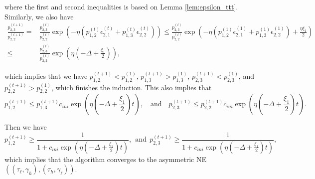 where the first and second inequalities is based on Lemma \ref{lem:epsilon_ttt}. Similarly, we also have 
\begin{equation*}
    \begin{split}
  \frac{p^{(t+1)}_{2,3}}{p^{(t+1)}_{2,2}} = {} & \frac{p^{(t)}_{2,3}}{p^{(t)}_{2,2}}\exp\left(-\eta\left(p^{(t)}_{1,2}\epsilon^{(t)}_{2,1} + p^{(t)}_{1,3}\epsilon^{(t)}_{2,2}\right)\right) \leq \frac{p^{(t)}_{2,3}}{p^{(t)}_{2,2}}\exp\left(-\eta\left(p^{(1)}_{1,2}\epsilon^{(1)}_{2,1} + p^{(1)}_{1,3}\epsilon^{(1)}_{2,2}\right)+\frac{\eta\xi_1}{2}\right)\\
  \leq {} & \frac{p^{(t)}_{2,3}}{p^{(t)}_{2,2}}\exp\left(\eta\left(-\Delta+\frac{\xi_1}{2}\right)\right),       
    \end{split}
\end{equation*}

which implies that we have $p^{(t+1)}_{1,2}< p^{(1)}_{1,2}$,  $p^{(t+1)}_{1,3}> p^{(1)}_{1,3}$, $p^{(t+1)}_{2,3}<p^{(1)}_{2,3}$, and $p^{(t+1)}_{2,2}>p^{(1)}_{2,2}$, which finishes the induction. This also implies that 
\[
p^{(t+1)}_{1,2}\leq p^{(t+1)}_{1,3}c_{ini}\exp\left(\eta\left(-\Delta+\frac{\xi_1}{2}\right)t\right), \quad \text{and} \quad p^{(t+1)}_{2,3}\leq p^{(t+1)}_{2,2}c_{ini}\exp\left(\eta\left(-\Delta+\frac{\xi_1}{2}\right)t\right).
\]





Then we have 
\[
p^{(t+1)}_{1,2}\geq \frac{1}{1+c_{ini}\exp\left(\eta\left(-\Delta+\frac{\xi_1}{2}\right)t\right)},\ \ \text{and}\ \ p^{(t+1)}_{2,3}\geq \frac{1}{1+c_{ini}\exp\left(\eta\left(-\Delta+\frac{\xi_1}{2}\right)t\right)},
\]
which implies that the algorithm converges to the asymmetric NE $((\tau_{\ell},\gamma_{h}),(\tau_{h},\gamma_{\ell}))$. 

